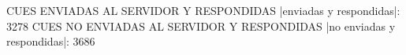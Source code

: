 CUES ENVIADAS AL SERVIDOR Y RESPONDIDAS
|enviadas y respondidas|: 3278
CUES NO ENVIADAS AL SERVIDOR Y RESPONDIDAS
|no enviadas y respondidas|: 3686